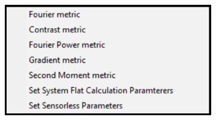 \begin{figure}
\begin{subfigure}{0.25\textwidth}
		\caption{}
		\label{fig:DM_methods_cockpit}
	\end{subfigure}
	\begin{subfigure}{0.5\textwidth}
		\centering
		\includegraphics[width=\linewidth]{images/DM_methods_cockpit_options.png}
		\caption{}
		\label{fig:DM_methods_cockpit_options}
	\end{subfigure}
	

\end{figure}
